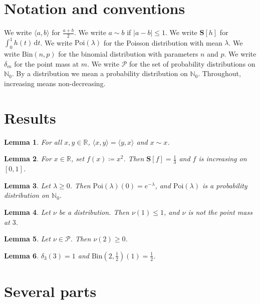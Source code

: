 \documentclass{article}
\newtheorem{lemma}{Lemma}
\begin{document}
\section{Notation and conventions}

We write $\langle a,b\rangle$ for $\frac{a+b}{2}$.
We write $a\sim b$ if $|a-b|\le1$.
We write $\mathbf S[h]$ for $\int_0^1 h(t)\,\mathrm{d}t$.
We write $\mathrm{Poi}(\lambda)$ for the Poisson distribution with mean $\lambda$.
We write $\mathrm{Bin}(n,p)$ for the binomial distribution with parameters $n$ and $p$.
We write $\delta_m$ for the point mass at $m$.
We write $\mathcal P$ for the set of probability distributions on $\mathbb N_0$.
By a distribution we mean a probability distribution on $\mathbb N_0$.
Throughout, increasing means non-decreasing.

\section{Results}

\begin{lemma}\label{mid}
For all $x,y\in\mathbb{R}$, $\langle x,y\rangle=\langle y,x\rangle$ and $x\sim x$.
\end{lemma}

\begin{lemma}\label{int}
For $x\in\mathbb{R}$, set $f(x)\coloneqq x^2$. Then $\mathbf S[f]=\frac13$ and $f$ is increasing on $[0,1]$.
\end{lemma}

\begin{lemma}\label{poi}
Let $\lambda\ge0$. Then $\mathrm{Poi}(\lambda)(0)=e^{-\lambda}$, and $\mathrm{Poi}(\lambda)$ is a probability distribution on $\mathbb N_0$.
\end{lemma}

\begin{lemma}\label{dist}
Let $\nu$ be a distribution. Then $\nu(1)\le1$, and $\nu$ is not the point mass at $3$.
\end{lemma}

\begin{lemma}\label{class}
Let $\nu\in\mathcal P$. Then $\nu(2)\ge0$.
\end{lemma}

\begin{lemma}\label{values}
$\delta_3(3)=1$ and $\mathrm{Bin}(2,\frac12)(1)=\frac12$.
\end{lemma}

\section{Several parts}
\end{document}
